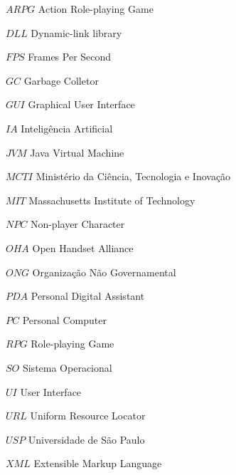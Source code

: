 
\begin{simbolos} \itemsep -1pt
\item[$ ARPG $] Action Role-playing Game
\item [$ DLL $] Dynamic-link library
\item[$ FPS $] Frames Per Second
\item [$ GC $] Garbage Colletor
\item[$ GUI $] Graphical User Interface

\item[$ IA $] Inteligência Artificial
\item [$ JVM $] Java Virtual Machine
\item [$ MCTI $] Ministério da Ciência, Tecnologia e Inovação
\item [$ MIT $] Massachusetts Institute of Technology
\item[$ NPC $] Non-player Character
\item [$ OHA $] Open Handset Alliance
\item [$ ONG $] Organização Não Governamental
\item [$ PDA $] Personal Digital Assistant
\item [$ PC $] Personal Computer
\item[$ RPG $] Role-playing Game
\item [$ SO $] Sistema Operacional
\item[$ UI $] User Interface
\item [$ URL $] Uniform Resource Locator
\item [$ USP $] Universidade de São Paulo 
\item [$ XML $] Extensible Markup Language

\end{simbolos}